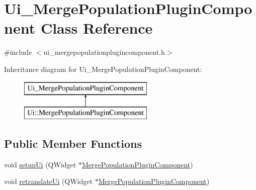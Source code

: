 \hypertarget{class_ui___merge_population_plugin_component}{}\section{Ui\+\_\+\+Merge\+Population\+Plugin\+Component Class Reference}
\label{class_ui___merge_population_plugin_component}


{\ttfamily \#include $<$ui\+\_\+mergepopulationplugincomponent.\+h$>$}

Inheritance diagram for Ui\+\_\+\+Merge\+Population\+Plugin\+Component\+:\begin{figure}[H]
\begin{center}
\leavevmode
\includegraphics[height=2.000000cm]{dd/d6a/class_ui___merge_population_plugin_component}
\end{center}
\end{figure}
\subsection*{Public Member Functions}
\begin{DoxyCompactItemize}
\item 
void \mbox{\hyperlink{class_ui___merge_population_plugin_component_a96660923bcf4f8084e877b65cbbad016}{setup\+Ui}} (Q\+Widget $\ast$\mbox{\hyperlink{class_merge_population_plugin_component}{Merge\+Population\+Plugin\+Component}})
\item 
void \mbox{\hyperlink{class_ui___merge_population_plugin_component_a839539fbbb0beaf7886ad7d21e5a0880}{retranslate\+Ui}} (Q\+Widget $\ast$\mbox{\hyperlink{class_merge_population_plugin_component}{Merge\+Population\+Plugin\+Component}})
\end{DoxyCompactItemize}
